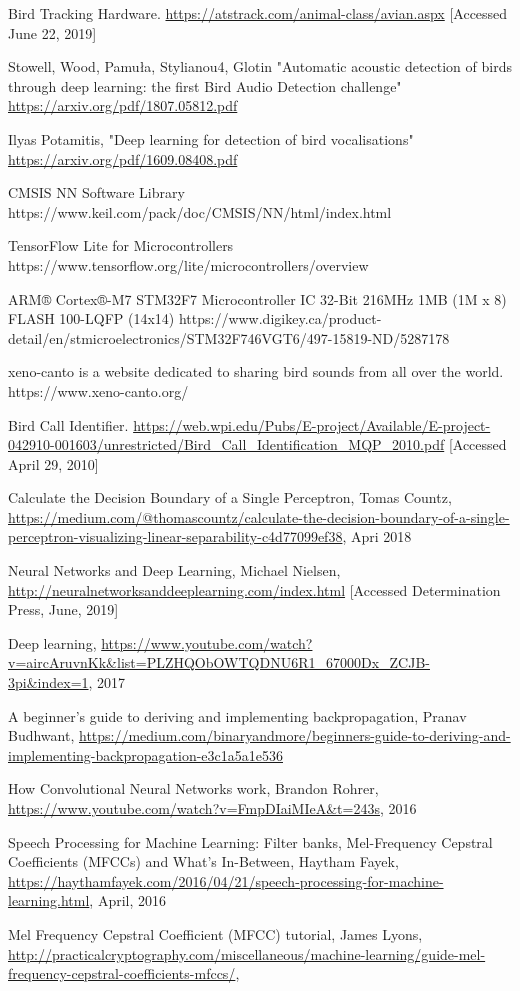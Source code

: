 \documentclass{article}
\begin{document}
\begin{thebibliography}{1}

Bird Tracking Hardware.
\url{https://atstrack.com/animal-class/avian.aspx} [Accessed June 22, 2019]

Stowell, Wood, Pamuła, Stylianou4, Glotin "Automatic acoustic detection of birds through deep learning: the first Bird Audio Detection challenge"
\url{https://arxiv.org/pdf/1807.05812.pdf}

Ilyas Potamitis, "Deep learning for detection of bird vocalisations"
\url{https://arxiv.org/pdf/1609.08408.pdf}

CMSIS NN Software Library
https://www.keil.com/pack/doc/CMSIS/NN/html/index.html

TensorFlow Lite for Microcontrollers
https://www.tensorflow.org/lite/microcontrollers/overview

ARM® Cortex®-M7 STM32F7 Microcontroller IC 32-Bit 216MHz 1MB (1M x 8) FLASH 100-LQFP (14x14)
https://www.digikey.ca/product-detail/en/stmicroelectronics/STM32F746VGT6/497-15819-ND/5287178

xeno-canto is a website dedicated to sharing bird sounds from all over the world.
https://www.xeno-canto.org/

Bird Call Identifier.
\url{https://web.wpi.edu/Pubs/E-project/Available/E-project-042910-001603/unrestricted/Bird_Call_Identification_MQP_2010.pdf} [Accessed April 29, 2010]

Calculate the Decision Boundary of a Single Perceptron,
Tomas Countz,
\url{https://medium.com/@thomascountz/calculate-the-decision-boundary-of-a-single-perceptron-visualizing-linear-separability-c4d77099ef38}, Apri 2018

Neural Networks and Deep Learning,
Michael Nielsen,
\url{http://neuralnetworksanddeeplearning.com/index.html} [Accessed Determination Press, June, 2019]

Deep learning,
\url{https://www.youtube.com/watch?v=aircAruvnKk&list=PLZHQObOWTQDNU6R1_67000Dx_ZCJB-3pi&index=1},
2017

A beginner’s guide to deriving and implementing backpropagation,
Pranav Budhwant,
\url{https://medium.com/binaryandmore/beginners-guide-to-deriving-and-implementing-backpropagation-e3c1a5a1e536}

How Convolutional Neural Networks work,
Brandon Rohrer,
\url{https://www.youtube.com/watch?v=FmpDIaiMIeA&t=243s},
2016

Speech Processing for Machine Learning: Filter banks, Mel-Frequency Cepstral Coefficients (MFCCs) and What's In-Between,
Haytham Fayek,
\url{https://haythamfayek.com/2016/04/21/speech-processing-for-machine-learning.html},
April, 2016

Mel Frequency Cepstral Coefficient (MFCC) tutorial,
James Lyons,
\url{http://practicalcryptography.com/miscellaneous/machine-learning/guide-mel-frequency-cepstral-coefficients-mfccs/},


\end{thebibliography}
\end{document}
